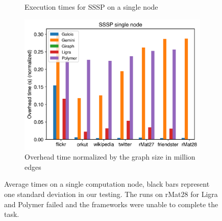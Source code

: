 \begin{figure}[t!]
\begin{subfigure}{0.3\textwidth}
		\caption{Execution times for SSSP on a single node}
		\label{fig:singleNodeSSSP_exec}
	\end{subfigure}
	\hfil
	\begin{subfigure}{0.3\textwidth}
		\includegraphics[width=\linewidth]{../../plots/singleNodeSSSP_overheadTimeNormalized.png}
		\caption{Overhead time normalized by the graph size in million edges}
		\label{fig:singleNodeSSSP_overheadNormalized}
	\end{subfigure}
	\caption{Average times on a single computation node, black bars represent one standard deviation in our testing.
	The runs on rMat28 for Ligra and Polymer failed and the frameworks were unable to complete the task.}
	\label{fig:singleNodeSSSP}
\end{figure}








